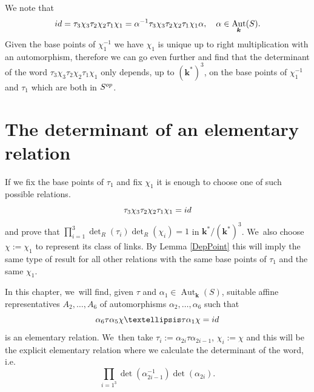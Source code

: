 \documentclass[10pt,a4paper]{amsart}
\newcommand{\ie}{i.e.\ }
\newcommand{\id}{\textup{id}}
\newcommand{\op}{\textup{op}}
\theoremstyle{definition}
\newcommand{\kk}{{\boldsymbol{k}}}
\DeclareMathOperator{\Aut}{Aut}
\begin{document}
We note that
\[
\id = \tau_3\chi_3\tau_2\chi_2\tau_1\chi_1 = \alpha^{-1}\tau_3\chi_3\tau_2\chi_2\tau_1\chi_1 \alpha, \quad\alpha \in \Aut_{\kk}(S).
\]
Given the base points of $\chi_1^{-1}$ we have $\chi_1$ is unique up to right multiplication with an automorphism, therefore we can go even further and find that the determinant of the word $\tau_3 \chi_3 \tau_2\chi_2 \tau_1 \chi_1$ only depends, up to $(\kk^*)^3$, on the base points of $\chi_1^{-1}$ and $\tau_1$ which are both in $S^{\op}$.

\section{The determinant of an elementary relation} \label{Sec5}
If we fix the base points of $\tau_1$ and fix $\chi_1$ it is enough to choose one of such possible relations.
\[
\tau_3\chi_3\tau_2\chi_2\tau_1\chi_1 = \id
\]
and prove that $\prod_{i=1}^3 \det_R(\tau_i)\det_R(\chi_i) = 1$ in $\kk^* /(\kk^*)^3$. We~also choose $\chi:= \chi_1$ to represent its class of links. By Lemma \ref{DepPoint} this will imply the same type of result for all other relations with the same base points of $\tau_1$ and the same $\chi_1$.

In this chapter, we~will find, given $\tau$ and $\alpha_1 \in \Aut_{\kk}(S)$, suitable affine representatives $A_2, \dots , A_6$ of automorphisms $\alpha_2, \dots , \alpha_6$ such that
\begin{equation} \label{eq: exaRel}
\alpha_6 \tau \alpha_5 \chi \dots \tau \alpha_1 \chi = \id
\end{equation}
is an elementary relation. We~then take $\tau_i := \alpha_{2i} \tau \alpha_{2i-1}$, $\chi_i:= \chi$ and this will be the explicit elementary relation where we calculate the determinant of the word, \ie
\[
\prod_{i=1^3}\det(\alpha_{2i - 1}^{-1})\det(\alpha_{2i}).
\]
\end{document}

